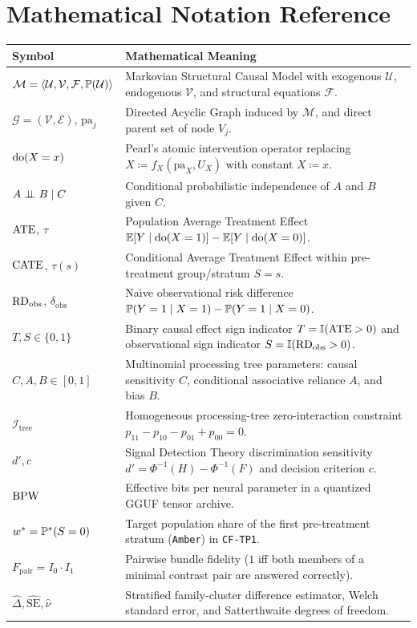 \chapter{Mathematical Notation Reference}\label{app:notation}
\begin{tabularx}{\textwidth}{@{}lX@{}}
\toprule
\textbf{Symbol} & \textbf{Mathematical Meaning} \\
\midrule
$\mathcal{M} = \langle \mathcal{U}, \mathcal{V}, \mathcal{F}, \mathbb{P}(\mathcal{U}) \rangle$ & Markovian Structural Causal Model with exogenous $\mathcal{U}$, endogenous $\mathcal{V}$, and structural equations $\mathcal{F}$. \\
$\mathcal{G} = (\mathcal{V}, \mathcal{E})$, $\mathrm{pa}_j$ & Directed Acyclic Graph induced by $\mathcal{M}$, and direct parent set of node $V_j$. \\
$\operatorname{do}(X=x)$ & Pearl's atomic intervention operator replacing $X \coloneqq f_X(\mathrm{pa}_X, U_X)$ with constant $X \coloneqq x$. \\
$A \perp\!\!\!\perp B \mid C$ & Conditional probabilistic independence of $A$ and $B$ given $C$. \\
$\mathrm{ATE}$, $\tau$ & Population Average Treatment Effect $\mathbb{E}[Y\mid \operatorname{do}(X=1)] - \mathbb{E}[Y\mid \operatorname{do}(X=0)]$. \\
$\mathrm{CATE}$, $\tau(s)$ & Conditional Average Treatment Effect within pre-treatment group/stratum $S=s$. \\
$\mathrm{RD}_{\mathrm{obs}}$, $\delta_{\mathrm{obs}}$ & Naive observational risk difference $\mathbb{P}(Y=1\mid X=1) - \mathbb{P}(Y=1\mid X=0)$. \\
$T, S \in \{0,1\}$ & Binary causal effect sign indicator $T=\mathbb{I}(\mathrm{ATE}>0)$ and observational sign indicator $S=\mathbb{I}(\mathrm{RD}_{\mathrm{obs}}>0)$. \\
$C, A, B \in [0,1]$ & Multinomial processing tree parameters: causal sensitivity $C$, conditional associative reliance $A$, and bias $B$. \\
$\mathcal{I}_{\mathrm{tree}}$ & Homogeneous processing-tree zero-interaction constraint $p_{11} - p_{10} - p_{01} + p_{00} = 0$. \\
$d', c$ & Signal Detection Theory discrimination sensitivity $d'=\Phi^{-1}(H)-\Phi^{-1}(F)$ and decision criterion $c$. \\
$\mathrm{BPW}$ & Effective bits per neural parameter in a quantized GGUF tensor archive. \\
$w^* = \mathbb{P}^*(S=0)$ & Target population share of the first pre-treatment stratum (\texttt{Amber}) in \texttt{CF-TP1}. \\
$F_{\mathrm{pair}} = I_0 \cdot I_1$ & Pairwise bundle fidelity ($1$ iff both members of a minimal contrast pair are answered correctly). \\
$\widehat{\Delta}, \widehat{\mathrm{SE}}, \hat{\nu}$ & Stratified family-cluster difference estimator, Welch standard error, and Satterthwaite degrees of freedom. \\
\bottomrule
\end{tabularx}

